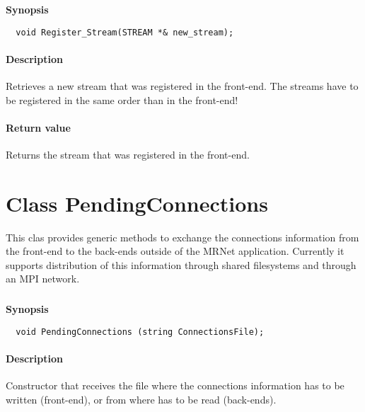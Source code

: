 \documentclass[twoside,a4,english,11pt]{book}
\begin{document}
\subsubsection{}

\textbf{Synopsis}
\begin{lstlisting}
  void Register_Stream(STREAM *& new_stream);
\end{lstlisting}

\paragraph{Description}
  Retrieves a new stream that was registered in the front-end. The streams have to be registered in the same order than 
  in the front-end!
 
\paragraph{Return value}
  Returns the stream that was registered in the front-end.
 
   
\section{Class PendingConnections}
  This clas provides generic methods to exchange the connections information from the front-end to the back-ends 
  outside of the MRNet application. Currently it supports distribution of this information through shared 
  filesystems and through an MPI network.
  

\subsubsection{}

\textbf{Synopsis}
\begin{lstlisting}
  void PendingConnections (string ConnectionsFile);
\end{lstlisting}

\paragraph{Description}
  Constructor that receives the file where the connections information has to be written (front-end), or from where has 
  to be read (back-ends).
  
\subsubsection{}
\end{document}
